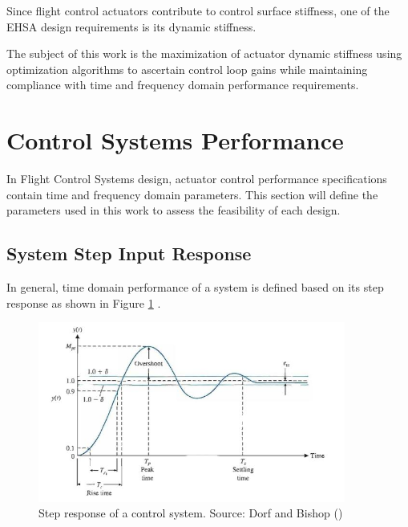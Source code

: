 Since flight control actuators contribute to control surface stiffness, one of the EHSA design requirements
is its dynamic stiffness.

The subject of this work is the maximization of actuator dynamic stiffness using optimization algorithms to ascertain control loop gains while maintaining compliance with time and frequency domain performance requirements. 


\section{Control Systems Performance}

In Flight Control Systems design, actuator control performance specifications contain time and frequency domain parameters. This section will define the parameters used in this work to assess the feasibility of each design.

\subsection{System Step Input Response}

In general, time domain performance of a system is defined based on its step response as shown in Figure \ref{fig:2_2_1_StepInputParameters} \cite{Dorf}.

\begin{figure}[H]
	\centering
	\centerline{\includegraphics[width=0.9\textwidth]{Figuras/2.TheoryBackground/2-2-1-StepResponseParameters.jpg}}
	\caption{Step response of a control system. Source: Dorf and Bishop (\citeyear{Dorf})}
	\label{fig:2_2_1_StepInputParameters}
\end{figure}

